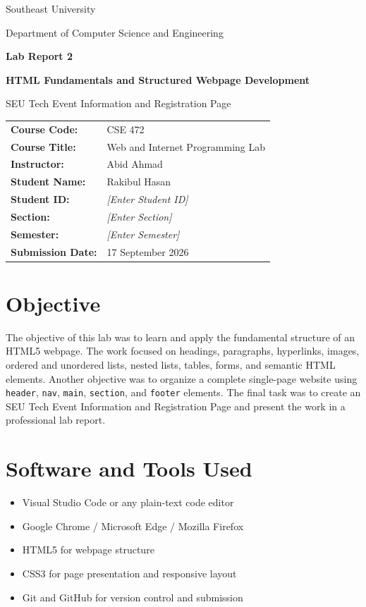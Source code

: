 \documentclass[12pt,a4paper]{article}
\begin{document}
\begin{titlepage}
\centering
{\Large Southeast University\par}\vspace{0.4cm}
{\large Department of Computer Science and Engineering\par}\vspace{1.5cm}
{\Huge \textbf{Lab Report 2}\par}\vspace{0.5cm}
{\LARGE \textbf{HTML Fundamentals and Structured Webpage Development}\par}\vspace{0.5cm}
{\large SEU Tech Event Information and Registration Page\par}\vfill
\begin{tabular}{>{\bfseries}p{4.2cm} p{8cm}}
Course Code: & CSE 472 \\
Course Title: & Web and Internet Programming Lab \\
Instructor: & Abid Ahmad \\
Student Name: & Rakibul Hasan \\
Student ID: & \textit{[Enter Student ID]} \\
Section: & \textit{[Enter Section]} \\
Semester: & \textit{[Enter Semester]} \\
Submission Date: & 17 September 2026 \\
\end{tabular}\vfill
\end{titlepage}
\tableofcontents\newpage
\section{Objective}
The objective of this lab was to learn and apply the fundamental structure of an HTML5 webpage. The work focused on headings, paragraphs, hyperlinks, images, ordered and unordered lists, nested lists, tables, forms, and semantic HTML elements. Another objective was to organize a complete single-page website using \texttt{header}, \texttt{nav}, \texttt{main}, \texttt{section}, and \texttt{footer} elements. The final task was to create an SEU Tech Event Information and Registration Page and present the work in a professional lab report.
\section{Software and Tools Used}
\begin{itemize}[leftmargin=1.5em]
\item Visual Studio Code or any plain-text code editor
\item Google Chrome / Microsoft Edge / Mozilla Firefox
\item HTML5 for webpage structure
\item CSS3 for page presentation and responsive layout
\item Git and GitHub for version control and submission
\end{itemize}
\end{document}
